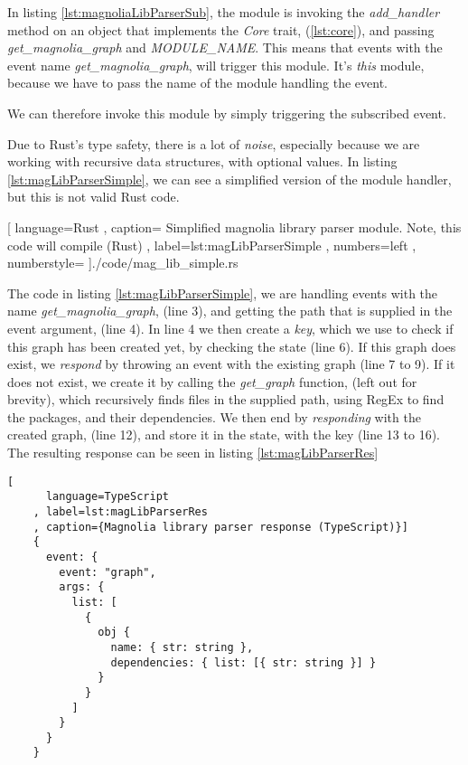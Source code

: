 In listing \ref{lst:magnoliaLibParserSub}, the module is invoking the
\textit{add\_handler} method on an object that implements the \textit{Core} trait,
(\ref{lst:core}), and passing \textit{get\_magnolia\_graph} and
\textit{MODULE\_NAME}. This means that events with the event name
\textit{get\_magnolia\_graph}, will trigger this module. It's \textit{this}
module, because we have to pass the name of the module handling the event.

We can therefore invoke this module by simply triggering the subscribed event.

Due to Rust's type safety, there is a lot of \textit{noise}, especially because
we are working with recursive data structures, with optional values. In listing
\ref{lst:magLibParserSimple}, we can see a simplified version of the module
handler, but this is not valid Rust code.

\begin{code}[H]
  
    [ language=Rust
    , caption={
      Simplified magnolia library parser module. Note, this code will compile
      (Rust)
    }
    , label=lst:magLibParserSimple
    , numbers=left
    , numberstyle=\tiny\color{gray}
    ]{./code/mag\_lib\_simple.rs}
\end{code}

The code in listing \ref{lst:magLibParserSimple}, we are handling events with
the name \textit{get\_magnolia\_graph}, (line 3), and getting the path that is
supplied in the event argument, (line 4). In line 4 we then create a
\textit{key}, which we use to check if this graph has been created yet, by
checking the state (line 6). If this graph does exist, we \textit{respond} by
throwing an event with the existing graph (line 7 to 9). If it does not exist,
we create it by calling the \textit{get\_graph} function,
(left out for brevity), which recursively finds files in the supplied path,
using RegEx to find the packages, and their dependencies. We then end by
\textit{responding} with the created graph, (line 12), and store it in the
state, with the key (line 13 to 16). The resulting response can be seen in
listing \ref{lst:magLibParserRes}

\begin{code}[H]
  \begin{lstlisting}[
      language=TypeScript
    , label=lst:magLibParserRes
    , caption={Magnolia library parser response (TypeScript)}]
    {
      event: {
        event: "graph",
        args: {
          list: [
            {
              obj {
                name: { str: string },
                dependencies: { list: [{ str: string }] }
              }
            }
          ]
        }
      }
    }
  \end{lstlisting}
\end{code}

